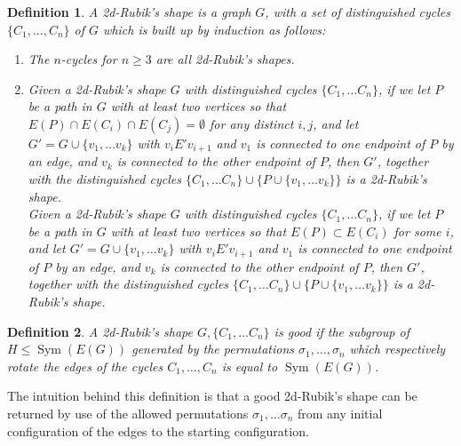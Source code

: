 \documentclass{article}
\DeclareMathOperator{\Sym}{Sym}
\newtheorem{definition}{Definition}[section]
\begin{document}
\begin{definition}
    A \emph{2d-Rubik's shape} is a graph $G$, with a set of distinguished cycles $\{C_1, \dots, C_n\}$ of $G$  which is built up by induction as follows:

    \begin{enumerate}
        \item The $n$-cycles for $n \geq 3$ are all 2d-Rubik's shapes.
        \item Given a 2d-Rubik's shape $G$ with distinguished cycles $\{C_1, \dots C_n\}$, if we let $P$ be a path in $G$ with at least two vertices so that $E(P) \cap E(C_i) \cap E(C_j) = \emptyset$ for any distinct $i, j$, and let $G' = G \cup \{v_1, \dots v_k\}$ with $v_i E' v_{i+1}$ and $v_1$ is connected to one endpoint of $P$ by an edge, and $v_k$ is connected to the other endpoint of $P$, then $G'$, together with the distinguished cycles $\{C_1, \dots C_n\} \cup \{P \cup \{v_1, \dots v_k\}\}$ is a 2d-Rubik's shape.\\

              Given a 2d-Rubik's shape $G$ with distinguished cycles $\{C_1, \dots C_n\}$, if we let $P$ be a path in $G$ with at least two vertices so that $E(P) \subset E(C_i)$ for some $i$, and let $G' = G \cup \{v_1, \dots v_k\}$ with $v_i E' v_{i+1}$ and $v_1$ is connected to one endpoint of $P$ by an edge, and $v_k$ is connected to the other endpoint of $P$, then $G'$, together with the distinguished cycles $\{C_1, \dots C_n\} \cup \{P \cup \{v_1, \dots v_k\}\}$ is a 2d-Rubik's shape.
    \end{enumerate}
\end{definition}

\begin{definition}
    A 2d-Rubik's shape $G, \{C_1, \dots C_n\}$ is \emph{good} if the subgroup of $H \leq \Sym(E(G))$ generated by the permutations $\sigma_1, \dots, \sigma_n$ which respectively rotate the edges of the cycles $C_1, \dots, C_n$ is equal to $\Sym(E(G))$.
\end{definition}
The intuition behind this definition is that a good 2d-Rubik's shape can be returned by use of the allowed permutations $\sigma_1, \dots \sigma_n$ from any initial configuration of the edges to the starting configuration.
\end{document}
